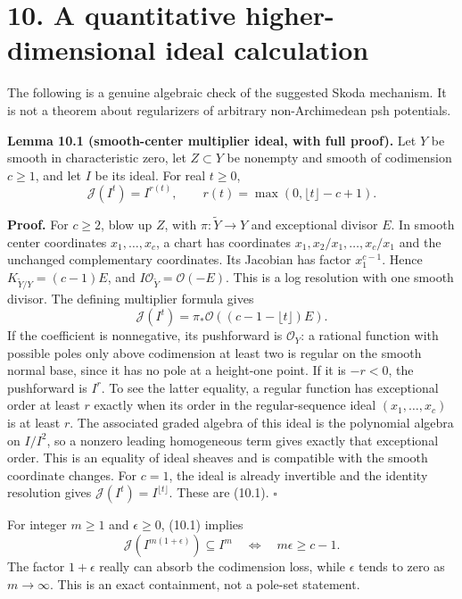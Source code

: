 \documentclass[
  10pt,
]{article}
\begin{document}
\section{10. A quantitative higher-dimensional ideal
calculation}\label{a-quantitative-higher-dimensional-ideal-calculation}

The following is a genuine algebraic check of the suggested Skoda
mechanism. It is not a theorem about regularizers of arbitrary
non-Archimedean psh potentials.

\textbf{Lemma 10.1 (smooth-center multiplier ideal, with full proof).}
Let \(Y\) be smooth in characteristic zero, let \(Z\subset Y\) be
nonempty and smooth of codimension \(c\geq1\), and let \(I\) be its
ideal. For real \(t\geq0\), \[
 \mathcal J(I^t)=I^{r(t)},\qquad
              r(t)=\max(0,\lfloor t\rfloor-c+1).                \tag{10.1}
\]

\textbf{Proof.} For \(c\geq2\), blow up \(Z\), with
\(\pi:\widetilde Y\to Y\) and exceptional divisor \(E\). In smooth
center coordinates \(x_1,\ldots,x_c\), a chart has coordinates
\(x_1,x_2/x_1,\ldots,x_c/x_1\) and the unchanged complementary
coordinates. Its Jacobian has factor \(x_1^{c-1}\). Hence
\(K_{\widetilde Y/Y}=(c-1)E\), and
\(I\mathcal O_{\widetilde Y}=\mathcal O(-E)\). This is a log resolution
with one smooth divisor. The defining multiplier formula gives \[
 \mathcal J(I^t)=\pi_*\mathcal O((c-1-\lfloor t\rfloor)E).
\] If the coefficient is nonnegative, its pushforward is
\(\mathcal O_Y\): a rational function with possible poles only above
codimension at least two is regular on the smooth normal base, since it
has no pole at a height-one point. If it is \(-r<0\), the pushforward is
\(I^r\). To see the latter equality, a regular function has exceptional
order at least \(r\) exactly when its order in the regular-sequence
ideal \((x_1,\ldots,x_c)\) is at least \(r\). The associated graded
algebra of this ideal is the polynomial algebra on \(I/I^2\), so a
nonzero leading homogeneous term gives exactly that exceptional order.
This is an equality of ideal sheaves and is compatible with the smooth
coordinate changes. For \(c=1\), the ideal is already invertible and the
identity resolution gives \(\mathcal J(I^t)=I^{\lfloor t\rfloor}\).
These are (10.1). \(\square\)

For integer \(m\geq1\) and \(\epsilon\geq0\), (10.1) implies \[
 \mathcal J(I^{m(1+\epsilon)})\subseteq I^m
                    \quad\Longleftrightarrow\quad
                         m\epsilon\geq c-1.                    \tag{10.2}
\] The factor \(1+\epsilon\) really can absorb the codimension loss,
while \(\epsilon\) tends to zero as \(m\to\infty\). This is an exact
containment, not a pole-set statement.
\end{document}
